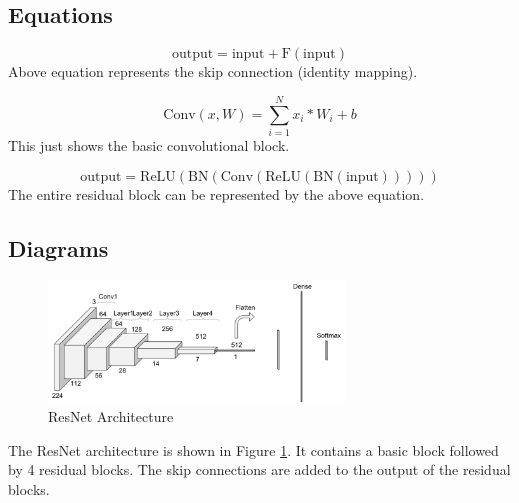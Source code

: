 \documentclass[10pt]{article}
\begin{document}
\subsection{Equations}
\[
\text{output} = \text{input} + \text{F}(\text{input})
\]
Above equation represents the skip connection (identity mapping).

\[
\text{Conv}(x, W) = \sum_{i=1}^{N} x_i \ast W_i + b
\]
This just shows the basic convolutional block.

\[
\text{output} = \text{ReLU}(\text{BN}(\text{Conv}(\text{ReLU}(\text{BN}(\text{input})))))
\]
The entire residual block can be represented by the above equation.

\subsection{Diagrams}
\begin{figure}[H]
    \centering
    \includegraphics[width=0.7\textwidth]{resnet.png}
    \caption{ResNet Architecture}
    \label{fig:resnet_arch}
\end{figure}
The ResNet architecture is shown in Figure \ref{fig:resnet_arch}. It contains a basic block followed by 4 residual blocks. The skip connections are added to the output of the residual blocks.
\end{document}
